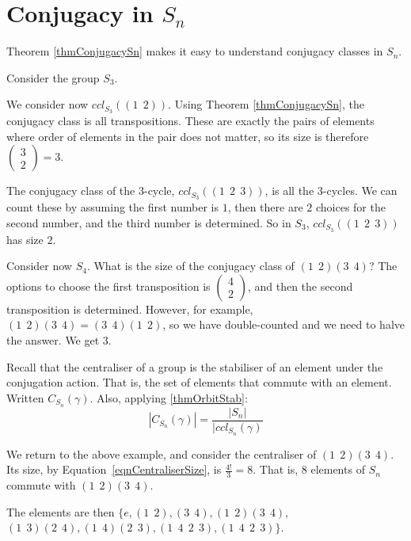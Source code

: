 \documentclass[../Main.tex]{subfiles}
\begin{document}
\section{Conjugacy in \texorpdfstring{$S_n$}{Sn}}
Theorem \ref{thmConjugacySn} makes it easy to understand conjugacy classes in $S_n$.
\begin{example}
Consider the group $S_3$.\par
We consider now $ccl_{S_3}((1~~2))$. Using Theorem \ref{thmConjugacySn}, the conjugacy class is all transpositions. These are exactly the pairs of elements where order of elements in the pair does not matter, so its size is therefore $\begin{pmatrix}3 \\ 2\end{pmatrix} = 3$.\par
The conjugacy class of the $3$-cycle, $ccl_{S_3}((1~~2~~3))$, is all the $3$-cycles. We can count these by assuming the first number is $1$, then there are $2$ choices for the second number, and the third number is determined. So in $S_3$, $ccl_{S_3}((1~~2~~3))$ has size $2$.\par
\end{example}
\begin{example}
    Consider now $S_4$.
    What is the size of the conjugacy class of $(1~~2)(3~~4)$? The options to choose the first transposition is $\begin{pmatrix}4 \\ 2\end{pmatrix}$, and then the second transposition is determined. However, for example, $(1~~2)(3~~4) = (3~~4)(1~~2)$, so we have double-counted and we need to halve the answer. We get $3$.
\end{example}
Recall that the centraliser of a group is the stabiliser of an element under the conjugation action. That is, the set of elements that commute with an element. Written $C_{S_n}(\gamma)$. Also, applying \ref{thmOrbitStab}:
\begin{equation}
|C_{S_n}(\gamma)| = \frac{|S_n|}{|ccl_{S_n}(\gamma)}
\label{eqnCentraliserSize}
\end{equation}
\begin{example}
We return to the above example, and consider the centraliser of $(1~~2)(3~~4)$. Its size, by Equation~\ref{eqnCentraliserSize}, is $\frac{4!}{3} = 8$. That is, $8$ elements of $S_n$ commute with $(1~~2)(3~~4)$.\par
The elements are then $\{e, (1~~2), (3~~4), (1~~2)(3~~4),$\newline$(1~~3)(2~~4), (1~~4)(2~~3), (1~~4~~2~~3), (1~~4~~2~~3)\}$.
\end{example}
\end{document}
